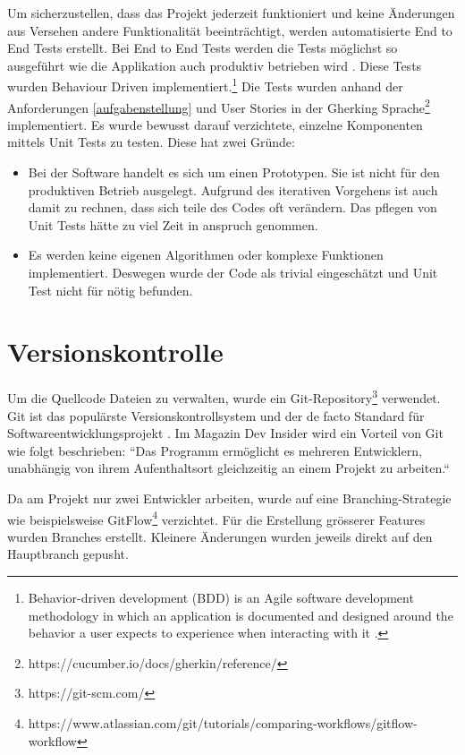 Um sicherzustellen, dass das Projekt jederzeit funktioniert und keine Änderungen
aus Versehen andere Funktionalität beeinträchtigt, werden automatisierte
End to End Tests erstellt. Bei End to End Tests werden die Tests möglichst
so ausgeführt wie die Applikation auch produktiv betrieben wird \parencite{georgian_2021}.
Diese Tests wurden Behaviour Driven implementiert.\footnote{
    Behavior-driven development (BDD) is an Agile software development methodology
    in which an application is documented and designed around the behavior a user
    expects to experience when interacting with it \parencite{what_is_bdd}.
}  Die Tests wurden anhand der Anforderungen \ref{aufgabenstellung}
und User Stories in der Gherking Sprache\footnote{https://cucumber.io/docs/gherkin/reference/} implementiert.
Es wurde bewusst darauf verzichtete, einzelne Komponenten mittels Unit Tests zu testen.
Diese hat zwei Gründe:
\begin{itemize}
    \item Bei der Software handelt es sich um einen Prototypen.
          Sie ist nicht für den produktiven Betrieb ausgelegt.
          Aufgrund des iterativen Vorgehens ist auch damit zu rechnen, dass sich teile des Codes oft verändern.
          Das pflegen von Unit Tests hätte zu viel Zeit in anspruch genommen.
    \item Es werden keine eigenen Algorithmen oder komplexe Funktionen implementiert.
          Deswegen wurde der Code als trivial eingeschätzt und Unit Test nicht für nötig befunden.
\end{itemize}



\section{Versionskontrolle}
Um die Quellcode Dateien zu verwalten, wurde ein Git-Repository\footnote{https://git-scm.com/} verwendet.
Git ist das populärste Versionskontrollsystem und der de facto Standard für Softwareentwicklungsprojekt \parencite{git}.
Im Magazin Dev Insider  wird ein Vorteil von Git wie folgt beschrieben:
``Das Programm ermöglicht es mehreren Entwicklern, unabhängig von ihrem Aufenthaltsort gleichzeitig an einem Projekt zu arbeiten.`` \cite{was_ist_git}

Da am Projekt nur zwei Entwickler arbeiten,
wurde auf eine Branching-Strategie wie beispielsweise
GitFlow\footnote{https://www.atlassian.com/git/tutorials/comparing-workflows/gitflow-workflow} verzichtet.
Für die Erstellung grösserer Features wurden Branches erstellt.
Kleinere Änderungen wurden jeweils direkt auf den Hauptbranch gepusht.

